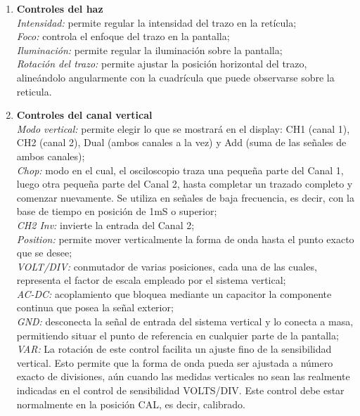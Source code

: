 \documentclass{article}
\begin{document}
\renewcommand{\labelenumi}{(\alph{enumi})}
\begin{enumerate}

	\item \textbf{Controles del haz}\bigskip \\ 
		  \textit{Intensidad:} permite regular la intensidad del trazo en la retícula; \medskip \\ 
		  \textit{Foco:} controla el enfoque del trazo en la pantalla; \medskip \\
		  \textit{Iluminación:} permite regular la iluminación sobre la pantalla; \medskip \\
		  \textit{Rotación del trazo:} permite ajustar la posición horizontal del trazo, alineándolo angularmente con la cuadrícula que puede observarse sobre la reticula. \medskip \\

	\item \textbf{Controles del canal vertical} \bigskip \\ 
		  \textit{Modo vertical:} permite elegir lo que se mostrará en el display: CH1 (canal 1), CH2 (canal 2), Dual (ambos canales a la vez) y Add (suma de las señales de ambos canales); \medskip \\
		  \textit{Chop:} modo en el cual, el osciloscopio traza una pequeña parte del Canal 1, luego otra pequeña parte del Canal 2, hasta completar un trazado completo y comenzar nuevamente. Se utiliza en señales de baja frecuencia, es decir, con la base de tiempo en posición de 1mS o superior; \medskip \\
		  \textit{CH2 Inv:} invierte la entrada del Canal 2; \medskip \\
		  \textit{Position:} permite mover verticalmente la forma de onda hasta el punto exacto que se desee; \medskip \\
		  \textit{VOLT/DIV:} conmutador de varias posiciones, cada una de las cuales, representa el factor de escala empleado por el sistema vertical; \medskip \\
		  \textit{AC-DC:} acoplamiento que bloquea mediante un capacitor la componente continua que posea la señal exterior; \medskip \\
		  \textit{GND:} desconecta la señal de entrada del sistema vertical y lo conecta a masa, permitiendo situar el punto de referencia en cualquier parte de la pantalla; \medskip \\
		  \textit{VAR:} La rotación de este control facilita un ajuste fino de la sensibilidad vertical. Esto permite que la forma de onda pueda ser ajustada a número exacto de divisiones, aún cuando las medidas verticales no sean las realmente indicadas en el control de sensibilidad VOLTS/DIV. Este control debe estar normalmente en la posición CAL, es decir, calibrado. \medskip \\


\end{enumerate}
\end{document}

